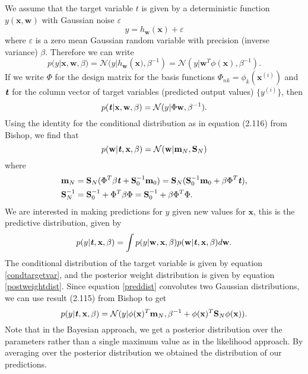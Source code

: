 \documentclass[english]{article}
\renewcommand{\epsilon}{\varepsilon}
\begin{document}
We assume that the target variable $t$ is given by a deterministic function $y(\textbf{x}, \textbf{w})$ with Gaussian noise $\epsilon$
\begin{equation}
y = h_\textbf{w}(\textbf{x}) + \epsilon
\end{equation}  
where $\epsilon$ is a zero mean Gaussian random variable with precision (inverse variance) $\beta$. Therefore we can write
\begin{equation}\label{condtargetvar}
	p({{y}}|\textbf{x}, \textbf{w}, \beta) = \mathcal{N}({{y}}| h_\textbf{w}(\textbf{x)},\beta^{-1}) = \mathcal{N}({{y}}| \textbf{w}^T\phi(\textbf{x}),\beta^{-1}).
\end{equation}
If we write $\Phi$ for the design matrix for the basis functions $\Phi_{nk} = \phi_k(\textbf{x}^{(i)})$ and $\textbf{\textit{t}}$ for the column vector of target variables (predicted output values) $\{y^{(i)}\}$, then 
\begin{equation}
p(\textbf{\textit{t}}|\textbf{x}, \textbf{w}, \beta) = \mathcal{N}({{y}}| \Phi \textbf{w},\beta^{-1}).
\end{equation}
Using the identity for the conditional distribution as in equation (2.116) from Bishop\cite{Bishop}, we find that
\begin{equation}\label{postweightdist}
	p(\textbf{w}|\textbf{\textit{t}}, \textbf{x}, \beta) = \mathcal{N}(\textbf{w}|\textbf{m}_N,\textbf{S}_N)
\end{equation}
where \begin{align}\label{postmean}
\textbf{m}_N &= \textbf{S}_N(\Phi^T\beta\textbf{\textit{t}}+\textbf{S}_0^{-1}\textbf{m}_0) = \textbf{S}_N(\textbf{S}_0^{-1}\textbf{m}_0 + \beta\Phi^T\textbf{\textit{t}}),\\
\textbf{S}_N^{-1} &= \textbf{S}_0^{-1} + \Phi^T\beta\Phi =  \textbf{S}_0^{-1} + \beta\Phi^T\Phi.
\end{align}
We are interested in making predictions for $y$ given new values for $\textbf{x}$, this is the predictive distribution, given by
\begin{equation}\label{preddist}
	p(y|\textbf{\textit{t}}, \textbf{x}, \beta) = \int p(y|\textbf{w}, \textbf{x}, \beta) p(\textbf{w}| \textbf{\textit{t}},\textbf{x},\beta) d\textbf{w}.
\end{equation}
The conditional distribution of the target variable is given by equation \ref{condtargetvar}, and the posterior weight distribution is given by equation \ref{postweightdist}. Since equation \ref{preddist} convolutes two Gaussian distributions, we can use result (2.115) from Bishop\cite{Bishop} to get
\begin{equation}
	p(y|\textbf{\textit{t}},\textbf{x},\beta) = \mathcal{N}(y|\phi(\textbf{x})^T \textbf{m}_N, \beta^{-1}+\phi(\textbf{x})^T \textbf{S}_N\phi(\textbf{x})).
\end{equation}
Note that in the Bayesian approach, we get a posterior distribution over the parameters rather than a single maximum value as in the likelihood approach. By averaging over the posterior distribution we obtained the distribution of our predictions. 
\end{document}
